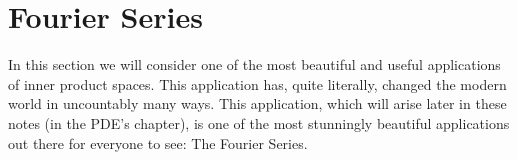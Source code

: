 




\newpage\section{Fourier Series}
In this section we will consider one of the most beautiful and useful
applications of inner product spaces.  This application has, quite literally, changed the modern world in uncountably
many ways.  This application, which will arise later in these notes (in the PDE's
chapter), is one of the most stunningly beautiful applications out there for everyone to
see: The Fourier Series.  

